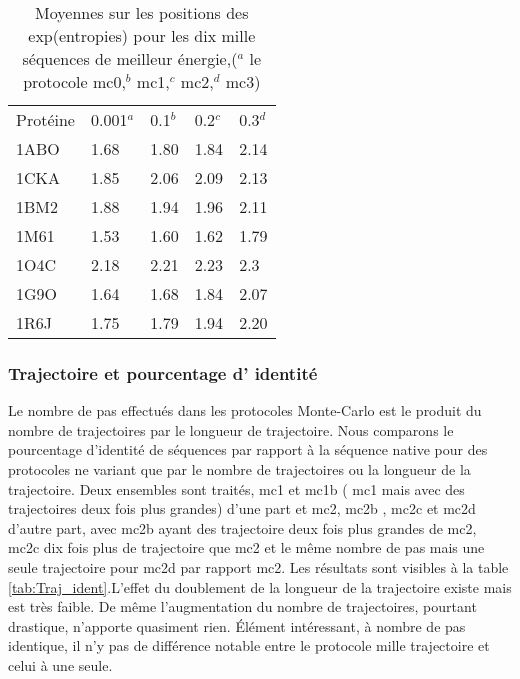     \begin{table}[!htbp]
      \centering
      
      \begin{tabular}{lllll}
        \toprule
         Protéine & 0.001$^a$ & 0.1$^b$ & 0.2$^c$  & 0.3$^d$ \\
        \cmidrule{1-5}      
        1ABO & 1.68 & 1.80 & 1.84 & 2.14  \\  
        1CKA & 1.85 & 2.06 & 2.09 & 2.13  \\ 
        1BM2 & 1.88 & 1.94 & 1.96 & 2.11  \\ 
        1M61 & 1.53 & 1.60 & 1.62 & 1.79  \\ 
        1O4C & 2.18 & 2.21 & 2.23 & 2.3   \\ 
        1G9O & 1.64 & 1.68 & 1.84 & 2.07  \\ 
        1R6J & 1.75 & 1.79 & 1.94 & 2.20  \\ 
        \bottomrule               
      \end{tabular}
      \caption{Moyennes sur les positions des exp(entropies) pour les dix mille séquences de meilleur énergie,($^a$ le protocole mc0,$^b$ mc1,$^c$  mc2,$^d$ mc3)}      
      \label{tab:Entro_mc}
    \end{table}

   \subsubsection{Trajectoire et pourcentage d' identité} 

Le nombre de pas effectués dans les protocoles Monte-Carlo est le produit du nombre de trajectoires par le longueur de trajectoire. Nous comparons le pourcentage d'identité de séquences par rapport à la séquence native pour des protocoles ne variant que par le nombre de trajectoires ou la longueur de la trajectoire. Deux ensembles sont traités, mc1 et mc1b ( mc1 mais avec des trajectoires deux fois plus grandes) d'une part et mc2, mc2b , mc2c et mc2d d'autre part, avec mc2b ayant des trajectoire deux fois plus grandes de mc2, mc2c dix fois plus de trajectoire que mc2 et le même nombre de pas mais une seule trajectoire pour mc2d par rapport mc2.
Les résultats sont visibles à la table \ref{tab:Traj_ident}.L'effet du doublement de la longueur de la trajectoire existe mais est très faible. De même l'augmentation du nombre de trajectoires, pourtant drastique, n'apporte quasiment rien. Élément intéressant, à nombre de pas identique, il n'y pas de différence notable entre le protocole mille trajectoire et celui à une seule.  


